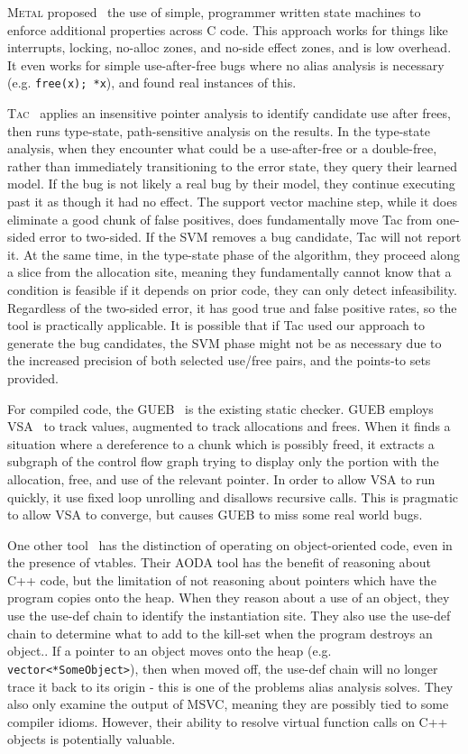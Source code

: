 \textsc{Metal} proposed~\cite{metal} the use of simple, programmer written state machines to enforce additional properties across C code.
This approach works for things like interrupts, locking, no-alloc zones, and no-side effect zones, and is low overhead.
It even works for simple use-after-free bugs where no alias analysis is necessary (e.g. \texttt{free(x); *x}), and found real instances of this.

\textsc{Tac}~\cite{tac} applies an insensitive pointer analysis to identify candidate use after frees, then runs type-state, path-sensitive analysis on the results.
In the type-state analysis, when they encounter what could be a use-after-free or a double-free, rather than immediately transitioning to the error state, they query their learned model.
If the bug is not likely a real bug by their model, they continue executing past it as though it had no effect.
The support vector machine step, while it does eliminate a good chunk of false positives, does fundamentally move Tac from one-sided error to two-sided.
If the SVM removes a bug candidate, Tac will not report it.
At the same time, in the type-state phase of the algorithm, they proceed along a slice from the allocation site, meaning they fundamentally cannot know that a condition is feasible if it depends on prior code, they can only detect infeasibility.
Regardless of the two-sided error, it has good true and false positive rates, so the tool is practically applicable.
It is possible that if Tac used our approach to generate the bug candidates, the SVM phase might not be as necessary due to the increased precision of both selected use/free pairs, and the points-to sets provided.

For compiled code, the GUEB~\cite{gueb} is the existing static checker.
GUEB employs VSA~\cite{vsa} to track values, augmented to track allocations and frees.
When it finds a situation where a dereference to a chunk which is possibly freed, it extracts a subgraph of the control flow graph trying to display only the portion with the allocation, free, and use of the relevant pointer.
In order to allow VSA to run quickly, it use fixed loop unrolling and disallows recursive calls.
This is pragmatic to allow VSA to converge, but causes GUEB to miss some real world bugs.

One other tool~\cite{dewey-uncovering-2015} has the distinction of operating on object-oriented code, even in the presence of vtables.
Their AODA tool has the benefit of reasoning about C++ code, but the limitation of not reasoning about pointers which have the program copies onto the heap.
When they reason about a use of an object, they use the use-def chain to identify the instantiation site.
They also use the use-def chain to determine what to add to the kill-set when the program destroys an object..
If a pointer to an object moves onto the heap (e.g. \texttt{vector<*SomeObject>}), then when moved off, the use-def chain will no longer trace it back to its origin - this is one of the problems alias analysis solves.
They also only examine the output of MSVC, meaning they are possibly tied to some compiler idioms.
However, their ability to resolve virtual function calls on C++ objects is potentially valuable.

